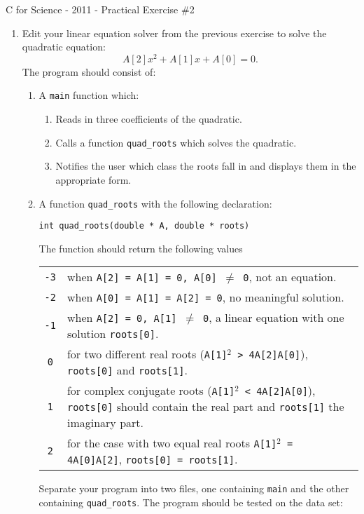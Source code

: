 \documentclass[a4paper,12pt]{article}
\begin{document}
\begin{center}
\large C for Science - 2011 - Practical Exercise \#2
\end{center}

\begin{enumerate}
\item Edit your linear equation solver from the previous exercise to solve the quadratic equation:
$$ A[2]x^2 + A[1]x + A[0] = 0.$$
The program should consist of:
\begin{enumerate}
\item A {\tt main} function which:
\begin{enumerate}
\item Reads in three coefficients of the quadratic.
\item Calls a function {\tt quad\_roots} which solves the quadratic.
\item Notifies the user which class the roots fall in and displays them in the appropriate form.
\end{enumerate}
\item A function {\tt quad\_roots} with the following declaration:
\begin{center}
\tt int quad\_roots(double * A, double * roots)
\end{center}
The function should return the following values
\begin{center}
\begin{tabular}{c p{414pt}}
\tt -3& when {\tt A[2] = A[1] = 0, A[0] $\neq$ 0}, not an equation.\\
\tt -2& when {\tt A[0] = A[1] = A[2] = 0}, no meaningful solution.\\
\tt -1& when {\tt A[2] = 0, A[1] $\neq$ 0}, a linear equation with one solution {\tt roots[0]}.\\
\tt 0& for two different real roots ({\tt A[1]$^2$ > 4A[2]A[0]}), {\tt roots[0]} and {\tt roots[1]}.\\
\tt 1& for complex conjugate roots ({\tt A[1]$^2$ < 4A[2]A[0]}), {\tt roots[0]} should contain the real part and {\tt roots[1]} the imaginary part.\\
\tt 2& for the case with two equal real roots {\tt A[1]$^2$ = 4A[0]A[2]}, {\tt roots[0] = roots[1]}.
\end{tabular}
\end{center}
Separate your program into two files, one containing {\tt main} and the other containing {\tt quad\_roots}. The program should be tested on the data set:
\begin{multicols}{2}
\begin{enumerate}

\end{enumerate}
\end{multicols}
\end{enumerate}
\end{enumerate}
\end{document}
